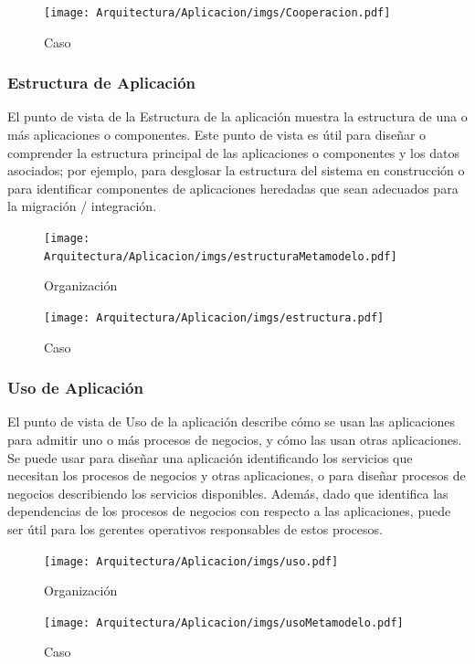 \begin{figure}[h!]
	\centering
	\texttt{[image: Arquitectura/Aplicacion/imgs/Cooperacion.pdf]}
	\caption{Caso}
\end{figure}

\newpage

\subsubsection{Estructura de Aplicación}
El punto de vista de la Estructura de la aplicación muestra la estructura de una o más aplicaciones o componentes. Este punto de vista es útil para diseñar o comprender la estructura principal de las aplicaciones o componentes y los datos asociados; por ejemplo, para desglosar la estructura del sistema en construcción o para identificar componentes de aplicaciones heredadas que sean adecuados para la migración / integración.
\begin{figure}[h!]
	\centering
	\texttt{[image: Arquitectura/Aplicacion/imgs/estructuraMetamodelo.pdf]}
	\caption{Organización}
\end{figure}
\newpage
{}

\begin{figure}[h!]
	\centering
	\texttt{[image: Arquitectura/Aplicacion/imgs/estructura.pdf]}
	\caption{Caso}
\end{figure}











\newpage

\subsubsection{Uso de Aplicación}
El punto de vista de Uso de la aplicación describe cómo se usan las aplicaciones para admitir uno o más procesos de negocios, y cómo las usan otras aplicaciones. Se puede usar para diseñar una aplicación identificando los servicios que necesitan los procesos de negocios y otras aplicaciones, o para diseñar procesos de negocios describiendo los servicios disponibles. Además, dado que identifica las dependencias de los procesos de negocios con respecto a las aplicaciones, puede ser útil para los gerentes operativos responsables de estos procesos.
\begin{figure}[h!]
	\centering
	\texttt{[image: Arquitectura/Aplicacion/imgs/uso.pdf]}
	\caption{Organización}
\end{figure}
\newpage
{}

\begin{figure}[h!]
	\centering
	\texttt{[image: Arquitectura/Aplicacion/imgs/usoMetamodelo.pdf]}
	\caption{Caso}
\end{figure}